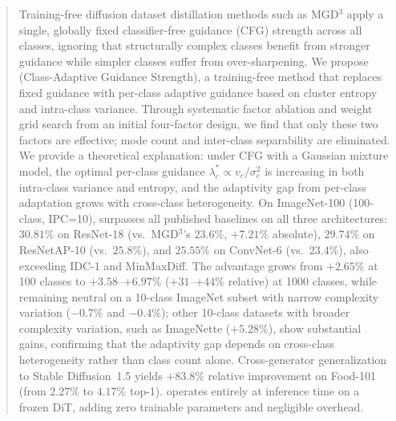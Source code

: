 \begin{abstract}
Training-free diffusion dataset distillation methods such as MGD$^3$ apply a single, globally fixed classifier-free guidance (CFG) strength across all classes, ignoring that structurally complex classes benefit from stronger guidance while simpler classes suffer from over-sharpening. We propose \cags{} (Class-Adaptive Guidance Strength), a training-free method that replaces fixed guidance with per-class adaptive guidance based on cluster entropy and intra-class variance. Through systematic factor ablation and weight grid search from an initial four-factor design, we find that only these two factors are effective; mode count and inter-class separability are eliminated. We provide a theoretical explanation: under CFG with a Gaussian mixture model, the optimal per-class guidance $\lambda_c^* \propto v_c / \sigma_c^2$ is increasing in both intra-class variance and entropy, and the adaptivity gap from per-class adaptation grows with cross-class heterogeneity. On ImageNet-100 (100-class, IPC=10), \cags{} surpasses all published baselines on all three architectures: $30.81\%$ on ResNet-18 (vs.\ MGD$^3$'s $23.6\%$, $+7.21\%$ absolute), $29.74\%$ on ResNetAP-10 (vs.\ $25.8\%$), and $25.55\%$ on ConvNet-6 (vs.\ $23.4\%$), also exceeding IDC-1 and MinMaxDiff. The advantage grows from $+2.65\%$ at 100 classes to $+3.58$--$+6.97\%$ ($+31$--$+44\%$ relative) at 1000 classes, while remaining neutral on a 10-class ImageNet subset with narrow complexity variation ($-0.7\%$ and $-0.4\%$); other 10-class datasets with broader complexity variation, such as ImageNette ($+5.28\%$), show substantial gains, confirming that the adaptivity gap depends on cross-class heterogeneity rather than class count alone. Cross-generator generalization to Stable Diffusion~1.5 yields $+83.8\%$ relative improvement on Food-101 (from $2.27\%$ to $4.17\%$ top-1). \cags{} operates entirely at inference time on a frozen DiT, adding zero trainable parameters and negligible overhead.
\end{abstract}
